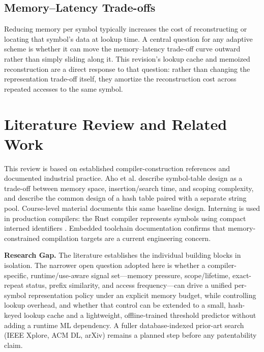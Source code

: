 \documentclass[conference]{IEEEtran}
\begin{document}
\subsection{Memory--Latency Trade-offs}
Reducing memory per symbol typically increases the cost of reconstructing or
locating that symbol's data at lookup time. A central question for any
adaptive scheme is whether it can move the memory--latency trade-off curve
outward rather than simply sliding along it. This revision's lookup cache and
memoized reconstruction are a direct response to that question: rather than
changing the representation trade-off itself, they amortize the
reconstruction cost across repeated accesses to the same symbol.

\section{Literature Review and Related Work}
This review is based on established compiler-construction references and
documented industrial practice. Aho et al. \cite{aho} describe symbol-table
design as a trade-off between memory space, insertion/search time, and
scoping complexity, and describe the common design of a hash table paired
with a separate string pool. Course-level material \cite{liu-lab2,
jones-notes} documents this same baseline design. Interning is used in
production compilers: the Rust compiler represents symbols using compact
interned identifiers \cite{rust-interning}. Embedded toolchain documentation
\cite{gcc-msp430} confirms that memory-constrained compilation targets are a
current engineering concern.

\textbf{Research Gap.} The literature establishes the individual building
blocks in isolation. The narrower open question adopted here is whether a
compiler-specific, runtime/use-aware signal set---memory pressure,
scope/lifetime, exact-repeat status, prefix similarity, and access
frequency---can drive a unified per-symbol representation policy under an
explicit memory budget, while controlling lookup overhead, and whether that
control can be extended to a small, hash-keyed lookup cache and a
lightweight, offline-trained threshold predictor without adding a runtime ML
dependency. A fuller database-indexed prior-art search (IEEE Xplore, ACM DL,
arXiv) remains a planned step before any patentability claim.
\end{document}
